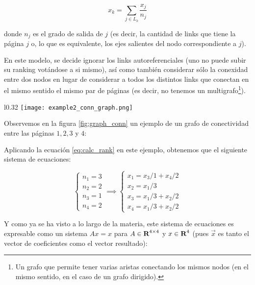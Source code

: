 \begin{equation}\label{eq:calc_rank}
    x_k = \sum_{j\in L_k} \dfrac{x_j}{n_j} 
\end{equation}

donde $n_j$ es el grado de salida de $j$ (es decir, la cantidad de links que
tiene la p\'agina $j$ o, lo que es equivalente, los ejes salientes del nodo
correspondiente a $j$).

\par En este modelo, se decide ignorar los links autoreferenciales (uno no puede
subir su ranking vot\'andose a si mismo), as\'i como tambi\'en considerar s\'olo
la conexidad entre dos nodos en lugar de considerar a todos los distintos links
que conectan en el mismo sentido el mismo par de p\'aginas (es decir, no
tenemos un multigrafo\footnote{Un grafo que permite tener varias aristas
conectando los mismos nodos (en el mismo sentido, en el caso de un grafo
dirigido).}).

\begin{wrapfigure}[12]{l}{0.32\textwidth}
    \texttt{[image: example2\_conn\_graph.png]}
    \caption{Grafo de Conectividad~\cite{Bryan2006}}
    \label{fig:graph_conn}
\end{wrapfigure}
\noindent

\par Observemos en la figura \ref{fig:graph_conn} un ejemplo de un grafo de
conectividad entre las p\'aginas $1, 2, 3$ y $4$:

\par Aplicando la ecuaci\'on \ref{eq:calc_rank} en este ejemplo, obtenemos que
el siguiente sistema de ecuaciones:

\begin{equation}
    \begin{cases}
        n_1 = 3\\
        n_2 = 2\\
        n_3 = 1\\
        n_4 = 2
    \end{cases}
    \implies
    \begin{cases}
        x_1 = x_3/1 + x_4/2\\
        x_2 = x_1/3\\
        x_3 = x_1/3 + x_2/2\\
        x_4 = x_1/3 + x_2/2
    \end{cases}
\end{equation}

\par Y como ya se ha visto a lo largo de la materia, este sistema de ecuaciones
es expresable como un sistema $Ax = x$ para $A\in\hbox{\bf R}^{4\times4}$ y
$x\in\hbox{\bf R}^4 $ (pues $\vec{x}$ es tanto el vector de coeficientes
como el vector resultado):

